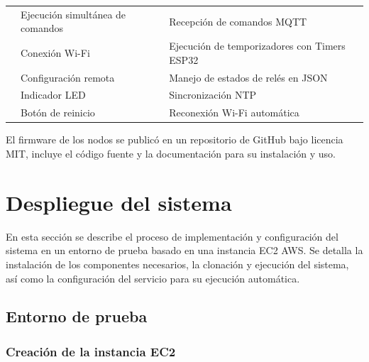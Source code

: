 \begin{table}[H]
\begin{tabular}{p{1.5cm}p{5.4cm}p{5.5cm}}
                                                          & Ejecución simultánea de comandos                                              & Recepción de comandos MQTT                     \\
                                                          & Conexión Wi-Fi                                                                & Ejecución de temporizadores con Timers ESP32   \\
                                                          & Configuración remota                                                          & Manejo de estados de relés en JSON             \\
                                                          & Indicador LED                                                                 & Sincronización NTP                             \\
                                                          & Botón de reinicio                                                             & Reconexión Wi-Fi automática                    \\
        \hline
    \end{tabular}
    \label{tab:nodos_iot}
\end{table}

El firmware de los nodos se publicó en un repositorio de GitHub
\cite{GithubFirmware} bajo licencia MIT, incluye el código fuente y la
documentación para su instalación y uso.

\section{Despliegue del sistema}

En esta sección se describe el proceso de implementación y configuración del
sistema en un entorno de prueba basado en una instancia EC2 AWS. Se detalla la
instalación de los componentes necesarios, la clonación y ejecución del
sistema, así como la configuración del servicio para su ejecución automática.

\subsection{Entorno de prueba}

\subsubsection{Creación de la instancia EC2}


